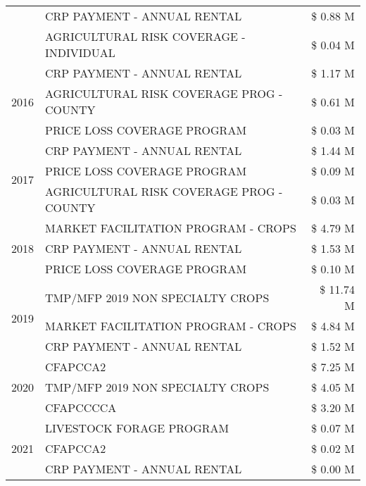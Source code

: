 \begin{tabular}{llr}
 & CRP PAYMENT - ANNUAL RENTAL & \$ 0.88 M \\
 & AGRICULTURAL RISK COVERAGE - INDIVIDUAL & \$ 0.04 M \\
\cline{1-3}
\multirow[t]{3}{*}{2016} & CRP PAYMENT - ANNUAL RENTAL & \$ 1.17 M \\
 & AGRICULTURAL RISK COVERAGE PROG - COUNTY & \$ 0.61 M \\
 & PRICE LOSS COVERAGE PROGRAM & \$ 0.03 M \\
\cline{1-3}
\multirow[t]{3}{*}{2017} & CRP PAYMENT - ANNUAL RENTAL & \$ 1.44 M \\
 & PRICE LOSS COVERAGE PROGRAM & \$ 0.09 M \\
 & AGRICULTURAL RISK COVERAGE PROG - COUNTY & \$ 0.03 M \\
\cline{1-3}
\multirow[t]{3}{*}{2018} & MARKET FACILITATION PROGRAM - CROPS & \$ 4.79 M \\
 & CRP PAYMENT - ANNUAL RENTAL & \$ 1.53 M \\
 & PRICE LOSS COVERAGE PROGRAM & \$ 0.10 M \\
\cline{1-3}
\multirow[t]{3}{*}{2019} & TMP/MFP 2019 NON SPECIALTY CROPS & \$ 11.74 M \\
 & MARKET FACILITATION PROGRAM - CROPS & \$ 4.84 M \\
 & CRP PAYMENT - ANNUAL RENTAL & \$ 1.52 M \\
\cline{1-3}
\multirow[t]{3}{*}{2020} & CFAPCCA2 & \$ 7.25 M \\
 & TMP/MFP 2019 NON SPECIALTY CROPS & \$ 4.05 M \\
 & CFAPCCCCA & \$ 3.20 M \\
\cline{1-3}
\multirow[t]{3}{*}{2021} & LIVESTOCK FORAGE PROGRAM & \$ 0.07 M \\
 & CFAPCCA2 & \$ 0.02 M \\
 & CRP PAYMENT - ANNUAL RENTAL & \$ 0.00 M \\
\cline{1-3}
\bottomrule
\end{tabular}
